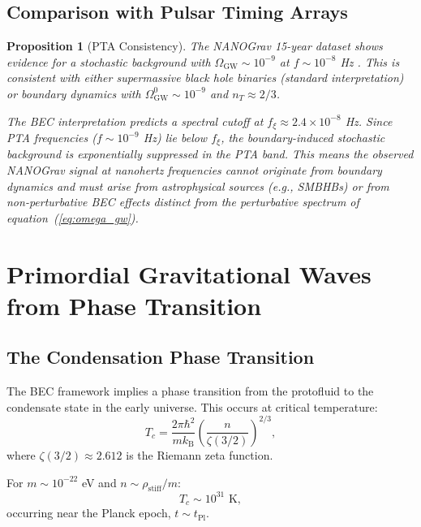 \documentclass[11pt,a4paper]{article}
\newcommand{\kB}{\ensuremath{k_{\mathrm{B}}}}
\newcommand{\tPl}{\ensuremath{t_{\mathrm{Pl}}}}
\newcommand{\rhostiff}{\ensuremath{\rho_{\mathrm{stiff}}}}
\newtheorem{proposition}[theorem]{Proposition}
\theoremstyle{definition}
\theoremstyle{remark}
\begin{document}
\subsection{Comparison with Pulsar Timing Arrays}
\label{sec:pta_comparison}

\begin{proposition}[PTA Consistency]
The NANOGrav 15-year dataset shows evidence for a stochastic background with $\Omega_{\mathrm{GW}} \sim 10^{-9}$ at $f \sim 10^{-8}$ Hz \cite{NANOGrav2023}. This is consistent with either supermassive black hole binaries (standard interpretation) or boundary dynamics with $\Omega_{\mathrm{GW}}^0 \sim 10^{-9}$ and $n_T \approx 2/3$.

The BEC interpretation predicts a spectral cutoff at $f_\xi \approx 2.4 \times 10^{-8}$ Hz. Since PTA frequencies ($f \sim 10^{-9}$ Hz) lie below $f_\xi$, the boundary-induced stochastic background is exponentially suppressed in the PTA band. This means the observed NANOGrav signal at nanohertz frequencies cannot originate from boundary dynamics and must arise from astrophysical sources (e.g., SMBHBs) or from non-perturbative BEC effects distinct from the perturbative spectrum of equation~(\ref{eq:omega_gw}).
\end{proposition}

\section{Primordial Gravitational Waves from Phase Transition}
\label{sec:primordial}

\subsection{The Condensation Phase Transition}
\label{sec:phase_transition}

The BEC framework implies a phase transition from the protofluid to the condensate state in the early universe. This occurs at critical temperature:
\begin{equation}
T_c = \frac{2\pi\hbar^2}{m\kB}\left(\frac{n}{\zeta(3/2)}\right)^{2/3},
\end{equation}
where $\zeta(3/2) \approx 2.612$ is the Riemann zeta function.

For $m \sim 10^{-22}$ eV and $n \sim \rhostiff/m$:
\begin{equation}
T_c \sim 10^{31} \text{ K},
\end{equation}
occurring near the Planck epoch, $t \sim \tPl$.
\end{document}
